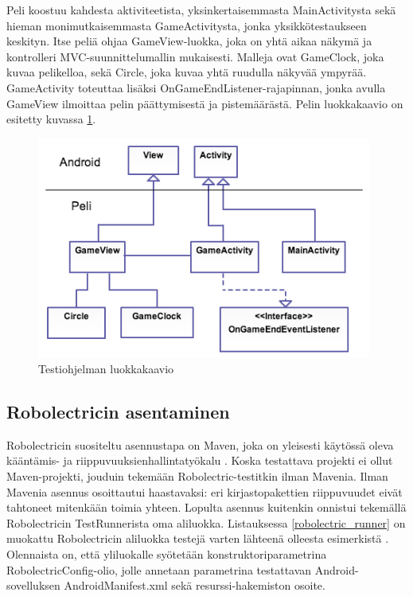 Peli koostuu kahdesta aktiviteetista, yksinkertaisemmasta MainActivitysta sekä hieman monimutkaisemmasta GameActivitysta, jonka yksikkötestaukseen keskityn. Itse peliä ohjaa GameView-luokka, joka on yhtä aikaa näkymä ja kontrolleri MVC-suunnittelumallin mukaisesti. Malleja ovat GameClock, joka kuvaa pelikelloa, sekä Circle, joka kuvaa yhtä ruudulla näkyvää ympyrää. GameActivity toteuttaa lisäksi OnGameEndListener-rajapinnan, jonka avulla GameView ilmoittaa pelin päättymisestä ja pistemäärästä. Pelin luokkakaavio on esitetty kuvassa \ref{game_classdiagram}.

\begin{figure}[htb]
\includegraphics[width=110mm]{peli_luokkakaavio.png}
\caption{Testiohjelman luokkakaavio} \label{game_classdiagram}
\end{figure}

\subsection{Robolectricin asentaminen}
\label{robolectric_install}

Robolectricin suositeltu asennustapa on Maven, joka on yleisesti käytössä oleva kääntämis- ja riippuvuuksienhallintatyökalu \cite{maven}. Koska testattava projekti ei ollut Maven-projekti, jouduin tekemään Robolectric-testitkin ilman Mavenia. Ilman Mavenia asennus osoittautui haastavaksi: eri kirjastopakettien riippuvuudet eivät tahtoneet mitenkään toimia yhteen. Lopulta asennus kuitenkin onnistui tekemällä Robolectricin TestRunnerista oma aliluokka. Listauksessa \ref{robolectric_runner} on muokattu Robolectricin aliluokka testejä varten lähteenä olleesta esimerkistä \cite{sample_runner}. Olennaista on, että yliluokalle syötetään konstruktoriparametrina RobolectricConfig-olio, jolle annetaan parametrina testattavan Android-sovelluksen AndroidManifest.xml sekä resurssi-hakemiston osoite.

